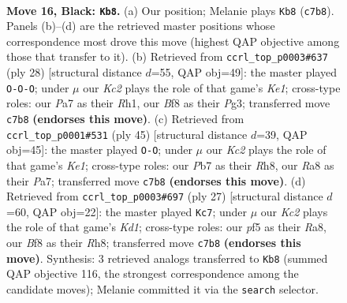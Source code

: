 \documentclass[11pt]{article}
\begin{document}
\clearpage

\begin{figure}[p]\centering
\begin{subfigure}{0.46\textwidth}\centering
\resizebox{\linewidth}{!}{%
\newchessgame
\chessboard[
  setfen={r4b1r/ppk3pp/5p1P/4pP2/P1P1n3/8/1P3P2/R1B1KB1R b KQ - 0 16},
  showmover=false,
  pgfstyle=straightmove, color=movearrow, markmove={c7-b8}
]}
\caption{}
\end{subfigure}\hfill
\begin{subfigure}{0.46\textwidth}\centering
\resizebox{\linewidth}{!}{%
\newchessgame
\chessboard[
  setfen={r1b4r/pp1nkp1p/4p3/3pP1p1/3N1P2/6P1/PPP4P/R3KB1R w KQ - 1 15},
  showmover=false,
  pgfstyle=straightmove, color=movearrow, markmove={e1-c1}
]}
\caption{}
\end{subfigure}
\\[4pt]
\begin{subfigure}{0.46\textwidth}\centering
\resizebox{\linewidth}{!}{%
\newchessgame
\chessboard[
  setfen={4k2r/pbr3p1/4p2p/2pp4/2P1nPP1/1P6/P1K4P/2BR1BR1 b k - 3 23},
  showmover=false,
  pgfstyle=straightmove, color=movearrow, markmove={e8-g8}
]}
\caption{}
\end{subfigure}\hfill
\begin{subfigure}{0.46\textwidth}\centering
\resizebox{\linewidth}{!}{%
\newchessgame
\chessboard[
  setfen={r2k3r/pb1n1pp1/1pp1p2p/4P2P/2P2B1R/2P5/P4PP1/R3KB2 b Q - 1 14},
  showmover=false,
  pgfstyle=straightmove, color=movearrow, markmove={d8-c7}
]}
\caption{}
\end{subfigure}
\caption{\textbf{Move 16, Black: \texttt{Kb8}.} (a) Our position; Melanie plays \texttt{Kb8} (\texttt{c7b8}). Panels (b)--(d) are the retrieved master positions whose correspondence most drove this move (highest QAP objective among those that transfer to it). (b) Retrieved from \texttt{ccrl\_top\_p0003\#637} (ply 28) [structural distance $d$=55, QAP obj=49]: the master played \texttt{O-O-O}; under $\mu$ our \emph{Kc2} plays the role of that game's \emph{Ke1}; cross-type roles: our \emph{P}a7 as their \emph{R}h1, our \emph{B}f8 as their \emph{P}g3; transferred move \texttt{c7b8} \textbf{(endorses this move)}. (c) Retrieved from \texttt{ccrl\_top\_p0001\#531} (ply 45) [structural distance $d$=39, QAP obj=45]: the master played \texttt{O-O}; under $\mu$ our \emph{Kc2} plays the role of that game's \emph{Ke1}; cross-type roles: our \emph{P}b7 as their \emph{R}h8, our \emph{R}a8 as their \emph{P}a7; transferred move \texttt{c7b8} \textbf{(endorses this move)}. (d) Retrieved from \texttt{ccrl\_top\_p0003\#697} (ply 27) [structural distance $d$=60, QAP obj=22]: the master played \texttt{Kc7}; under $\mu$ our \emph{Kc2} plays the role of that game's \emph{Kd1}; cross-type roles: our \emph{p}f5 as their \emph{R}a8, our \emph{B}f8 as their \emph{R}h8; transferred move \texttt{c7b8} \textbf{(endorses this move)}. Synthesis: 3 retrieved analogs transferred to \texttt{Kb8} (summed QAP objective 116, the strongest correspondence among the candidate moves); Melanie committed it via the \texttt{search} selector.}
\label{fig:thought-m31}
\end{figure}
\end{document}
